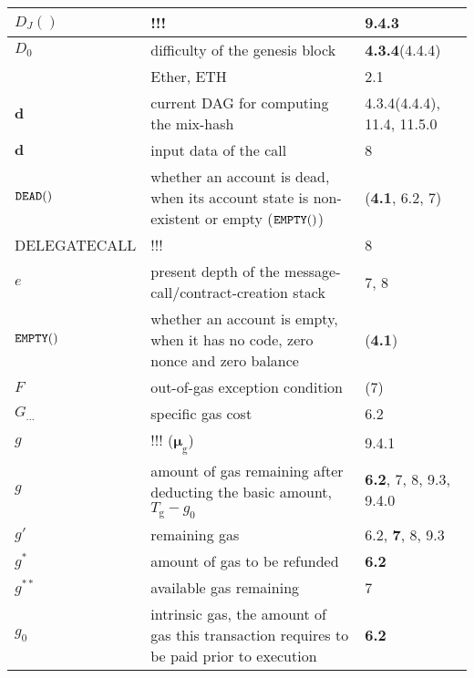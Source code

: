\documentclass[9pt,oneside]{amsart}
\newcommand{\reff}[1]{{\footnotesize #1}}
\begin{document}
\begin{longtabu}{X[1.2lm] X[3] X}
$D_{J}()$ &
!!! &
\reff{\textbf{9.4.3}} \\\hline

$D_0$ &
difficulty of the genesis block &
\reff{\textbf{4.3.4}(4.4.4)} \\\hline

\DH{} &
Ether, {\small ETH} &
\reff{2.1} \\\hline

$\mathbf{d}$ &
current DAG for computing the mix-hash &
\reff{4.3.4(4.4.4), 11.4, 11.5.0} \\\hline

$\mathbf{d}$ &
input data of the call &
\reff{8} \\\hline

$\mathtt{\tiny DEAD}()$ &
whether an account is dead, when its account state is non-existent or empty ($\mathtt{\tiny EMPTY}()$) &
\reff{(\textbf{4.1}, 6.2, 7)} \\\hline

{\small DELEGATECALL} &
!!! &
\reff{8} \\\hline

$e$ &
present depth of the message-call/contract-creation stack &
\reff{7, 8} \\\hline

$\mathtt{\tiny EMPTY}()$ &
whether an account is empty, when it has no code, zero nonce and zero balance &
\reff{(\textbf{4.1})} \\\hline

$F$ &
out-of-gas exception condition &
\reff{(7)} \\\hline

$G_{\mathrm{...}}$ &
specific gas cost &
\reff{6.2} \\\hline

$g$ &
!!! ($\boldsymbol{\mu}_{\mathrm{g}}$) &
\reff{9.4.1} \\\hline

$g$ &
amount of gas remaining after deducting the basic amount, $T_{\mathrm{g}} - g_0$ &
\reff{\textbf{6.2}, 7, 8, 9.3, 9.4.0} \\\hline

$g'$ &
remaining gas &
\reff{6.2, \textbf{7}, 8, 9.3} \\\hline

$g^*$ &
amount of gas to be refunded &
\reff{\textbf{6.2}} \\\hline

$g^{**}$ &
available gas remaining &
\reff{7} \\\hline

$g_0$ &
intrinsic gas, the amount of gas this transaction requires to be paid prior to execution &
\reff{\textbf{6.2}} \\\hline


\end{longtabu}
\end{document}
